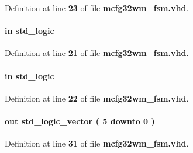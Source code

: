 Definition at line {\bf 23} of file {\bf mcfg32wm\+\_\+fsm.\+vhd}.

\paragraph[{sclk}]{ {\bfseries \textcolor{keywordflow}{in}\textcolor{vhdlchar}{ }} {\bfseries \textcolor{comment}{std\+\_\+logic}\textcolor{vhdlchar}{ }} \hspace{0.3cm}{\ttfamily [Port]}}\label{classmcfg32wm__fsm_ac922a2fc6a86b71aca5c7d49ea3bc36b}


Definition at line {\bf 21} of file {\bf mcfg32wm\+\_\+fsm.\+vhd}.

\paragraph[{sen}]{ {\bfseries \textcolor{keywordflow}{in}\textcolor{vhdlchar}{ }} {\bfseries \textcolor{comment}{std\+\_\+logic}\textcolor{vhdlchar}{ }} \hspace{0.3cm}{\ttfamily [Port]}}\label{classmcfg32wm__fsm_a5e69a30218f15bf1e4421d24cad846c0}


Definition at line {\bf 22} of file {\bf mcfg32wm\+\_\+fsm.\+vhd}.

\paragraph[{stateo}]{ {\bfseries \textcolor{keywordflow}{out}\textcolor{vhdlchar}{ }} {\bfseries \textcolor{comment}{std\+\_\+logic\+\_\+vector}\textcolor{vhdlchar}{ }\textcolor{vhdlchar}{(}\textcolor{vhdlchar}{ }\textcolor{vhdlchar}{ } \textcolor{vhdldigit}{5} \textcolor{vhdlchar}{ }\textcolor{keywordflow}{downto}\textcolor{vhdlchar}{ }\textcolor{vhdlchar}{ } \textcolor{vhdldigit}{0} \textcolor{vhdlchar}{ }\textcolor{vhdlchar}{)}\textcolor{vhdlchar}{ }} \hspace{0.3cm}{\ttfamily [Port]}}\label{classmcfg32wm__fsm_abd6b61c99643f61b2f28f4ecbe116ef1}


Definition at line {\bf 31} of file {\bf mcfg32wm\+\_\+fsm.\+vhd}.

